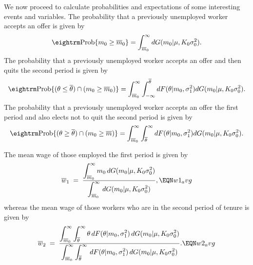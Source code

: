 We now proceed to calculate probabilities and expectations of some interesting
events and variables.  The probability that a previously unemployed worker
accepts an offer is given by
$${\rm Prob} \{m_0\ge\overline m_0\} = \int_{\overline m_0}^\infty dG (m_0|\mu,
K_0 \sigma^2_{0}).$$
The probability that a previously unemployed worker accepts an offer and then
quits the second period is given by
$$
{\rm Prob} \{(\th\le\overline\th)\cap (m_0\ge \overline m_0)\} =\int_{\overline m_0}^\infty
\int_{-\infty}^{\overline\th} dF(\th|m_0, \sigma^2_{1})
dG (m_0|\mu, K_0 \sigma^2_{0}).$$
The probability that a previously unemployed worker accepts an offer the first
period and also elects not to quit the second period is given by
$${\rm Prob} \{(\th\ge\overline \th)\cap (m_0\ge\overline m)\} =\int_{\overline m_0}^\infty
\int_{\overline\th}^\infty dF (\th|m_0, \sigma^2_{1})
dG (m_0|\mu, K_0 \sigma^2_{0}).$$

The mean wage of those employed the first period is given by
$$
\overline w_1 \;=\; { \displaystyle \int_{\overline m_0}^\infty m_0
                                    \, dG(m_0 \vert \mu, K_0 \sigma^2_{0})
         \over \displaystyle \int_{\overline m_0}^\infty
                                    \, dG(m_0 \vert \mu, K_0 \sigma^2_{0}) },
\EQN w1_avg
$$
whereas the mean wage of those workers who are in the second period of tenure
is given by
$$
\overline w_2 \;=\; { \displaystyle \int_{\overline m_0}^\infty
                 \int_{\overline \theta}^\infty \theta
                             \, dF(\theta \vert m_0, \sigma_{1}^2)
                             \, dG(m_0 \vert \mu, K_0 \sigma^2_{0})
         \over \displaystyle \int_{\overline m_0}^\infty
                 \int_{\overline \theta}^\infty
                             \, dF(\theta \vert m_0, \sigma_{1}^2)
                             \, dG(m_0 \vert \mu, K_0 \sigma^2_{0})     }.
\EQN w2_avg
$$

